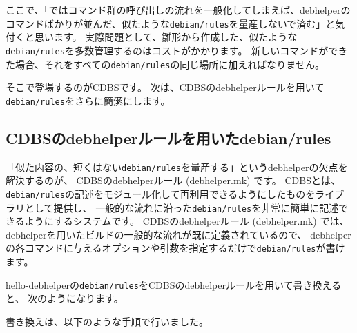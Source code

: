 \documentclass[mingoth,a4paper]{jsarticle}
\begin{document}
ここで、「ではコマンド群の呼び出しの流れを一般化してしまえば、debhelperのコマンドばかりが並んだ、似たような\texttt{debian/rules}を量産しないで済む」と気付くと思います。
実際問題として、雛形から作成した、似たような\texttt{debian/rules}を多数管理するのはコストがかかります。
新しいコマンドができた場合、それをすべての\texttt{debian/rules}の同じ場所に加えればなりません。

そこで登場するのがCDBSです。
次は、CDBSのdebhelperルールを用いて\texttt{debian/rules}をさらに簡潔にします。

\subsection{CDBSのdebhelperルールを用いたdebian/rules}

「似た内容の、短くはない\texttt{debian/rules}を量産する」というdebhelperの欠点を解決するのが、
CDBSのdebhelperルール (debhelper.mk) です。
CDBSとは、
\texttt{debian/rules}の記述をモジュール化して再利用できるようにしたものをライブラリとして提供し、
一般的な流れに沿った\texttt{debian/rules}を非常に簡単に記述できるようにするシステムです。
CDBSのdebhelperルール (debhelper.mk) では、
debhelperを用いたビルドの一般的な流れが既に定義されているので、
debhelperの各コマンドに与えるオプションや引数を指定するだけで\texttt{debian/rules}が書けます。

hello-debhelperの\texttt{debian/rules}をCDBSのdebhelperルールを用いて書き換えると、
次のようになります。


書き換えは、以下のような手順で行いました。
\end{document}
